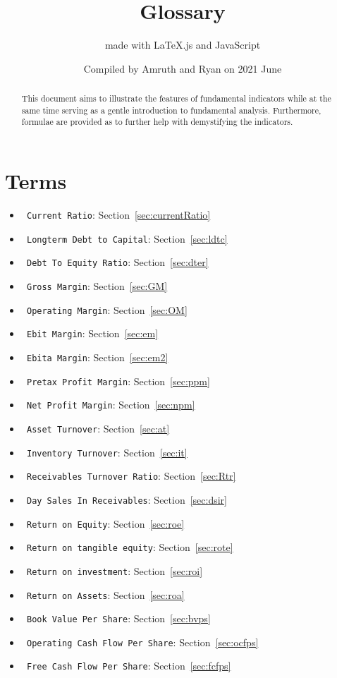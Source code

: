 \documentclass{article}
\title{Glossary}
\author{made with \LaTeX.js and JavaScript}
\date{Compiled by Amruth and Ryan on 2021 June}
\begin{document}
\maketitle


\begin{abstract}
This document aims to illustrate the features of fundamental indicators  while at the same time serving as a gentle introduction to fundamental analysis.
Furthermore, formulae are provided as to further help with demystifying the indicators. 
\end{abstract}

\section{Terms}
\begin{itemize}
    
    \item \texttt{ Current Ratio}: \normalsize{Section~\ref{sec:currentRatio}}
    \item \texttt{ Longterm Debt to Capital}: \normalsize{Section~\ref{sec:ldtc}}
    \item \texttt{ Debt To Equity Ratio}: \normalsize{Section~\ref{sec:dter}}
    \item \texttt{ Gross Margin}: \normalsize{Section~\ref{sec:GM}}
    \item \texttt{ Operating Margin}: \normalsize{Section~\ref{sec:OM}}
 	\item \texttt{ Ebit Margin}: \normalsize{Section~\ref{sec:em}}
    \item \texttt{ Ebita Margin}: \normalsize{Section~\ref{sec:em2}}
    \item \texttt{ Pretax Profit Margin}: \normalsize{Section~\ref{sec:ppm}}
    \item \texttt{ Net Profit Margin}: \normalsize{Section~\ref{sec:npm}}
    \item \texttt{ Asset Turnover}: \normalsize{Section~\ref{sec:at}}
    \item \texttt{ Inventory Turnover}: \normalsize{Section~\ref{sec:it}}
    \item \texttt{ Receivables Turnover Ratio}: \normalsize{Section~\ref{sec:Rtr}}
	\item \texttt{ Day Sales In Receivables}: \normalsize{Section~\ref{sec:dsir}}
    \item \texttt{ Return on Equity}: \normalsize{Section~\ref{sec:roe}}
	\item \texttt{ Return on tangible equity}: \normalsize{Section~\ref{sec:rote}}
	\item \texttt{ Return on investment}: \normalsize{Section~\ref{sec:roi}}
	\item \texttt{ Return on Assets}: \normalsize{Section~\ref{sec:roa}}
    \item \texttt{ Book Value Per Share}: \normalsize{Section~\ref{sec:bvps}}
	\item \texttt{ Operating Cash Flow Per Share}: \normalsize{Section~\ref{sec:ocfps}}
    \item \texttt{ Free Cash Flow Per Share}: \normalsize{Section~\ref{sec:fcfps}}
\end{itemize}
\end{document}
